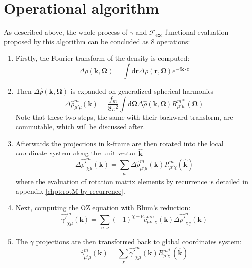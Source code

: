 \section{Operational algorithm\label{sec:Operational-algorithm}}

As described above, the whole process of $\gamma$ and $\mathcal{F}_{\mathrm{exc}}$
functional evaluation proposed by this algorithm can be concluded
as 8 operations:
\begin{enumerate}
\item Firstly, the Fourier transform of the density is computed:
\begin{equation}
\Delta\hat{\rho}(\mathbf{k},\mathbf{\Omega})=\int\mathrm{d}\mathbf{r}\Delta\rho(\mathbf{r},\mathbf{\Omega})e^{-i\mathbf{k}\cdot\mathbf{r}}\label{eq:fft3d-fwd}
\end{equation}
\item Then $\Delta\hat{\rho}(\mathbf{k},\mathbf{\Omega})$ is expanded on
generalized spherical harmonics
\begin{equation}
\Delta\hat{\rho}_{\mu'\mu}^{m}(\mathbf{k})=\frac{f_{m}}{8\pi^{2}}\int\mathrm{d}\mathbf{\Omega}\Delta\hat{\rho}(\mathbf{k},\mathbf{\Omega})R_{\mu'\mu}^{m*}(\mathbf{\Omega})\label{eq:fgsht-fwd}
\end{equation}
Note that these two steps, the same with their backward transform,
are commutable, which will be discussed after.
\item Afterwards the projections in k-frame are then rotated into the local
coordinate system along the unit vector $\mathbf{\hat{k}}$
\begin{equation}
\Delta\hat{\rho'}_{\chi\mu}^{m}(\mathbf{k})=\sum_{\mu'}\Delta\hat{\rho}_{\mu'\mu}^{m}(\mathbf{k})R_{\mu'\chi}^{m}(\mathbf{\hat{k}})
\end{equation}
where the evaluation of rotation matrix elements by recurrence is
detailed in appendix \ref{chpt:rotM-by-recurrence}.
\item Next, computing the OZ equation with Blum's reduction:
\begin{equation}
\hat{\gamma'}_{\chi\mu}^{m}(\mathbf{k})=\sum_{n,\nu}(-1)^{\chi+\nu}\hat{c}_{\mu\nu,\chi}^{mn}(\mathbf{k})\Delta\hat{\rho'}_{\chi\underline{\nu}}^{n}(\mathbf{k})\label{eq:OZ-2}
\end{equation}
\item The $\gamma$ projections are then transformed back to global coordinates
system:
\begin{equation}
\hat{\gamma}_{\mu'\mu}^{m}(\mathbf{k})=\sum_{\chi}\hat{\gamma'}_{\chi\mu}^{m}(\mathbf{k})R_{\mu'\chi}^{m*}(\mathbf{\hat{k}})

\end{equation}
\end{enumerate}
